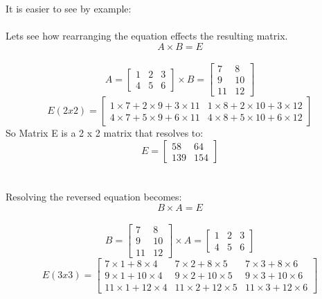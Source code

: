 \documentclass{article}
\begin{document}
It is easier to see by example:
\\
\\
Lets see how rearranging the equation effects the resulting matrix.
\begin{equation}
A \times B = E 
\end{equation}
\\
\[
A = \begin{bmatrix}
    1  &  2 & 3      \\
    4  &  5 & 6      
\end{bmatrix}
\times
B = \begin{bmatrix}
    7  &  8      \\
    9  &  10        \\
    11 & 12
\end{bmatrix}
\]
\[
E (2 x 2) = \begin{bmatrix}
    1 \times 7 + 2 \times 9 + 3 \times 11  &  1 \times 8 + 2 \times 10 + 3 \times 12     \\
    4 \times 7 + 5 \times 9 + 6 \times 11  &  4 \times 8 + 5 \times 10 + 6 \times 12     
\end{bmatrix}
\]
So Matrix E is a 2 x 2 matrix that resolves to:
\[
E = \begin{bmatrix}
    58  &  64     \\
    139  &  154     
\end{bmatrix}
\]
\\
\\
Resolving the reversed equation becomes:
\begin{equation}
B \times A = E 
\end{equation}
\\
\[
B = \begin{bmatrix}
    7  &  8      \\
    9  &  10        \\
    11 & 12
\end{bmatrix}
\times
A = \begin{bmatrix}
    1  &  2 & 3      \\
    4  &  5 & 6      
\end{bmatrix}
\]
\[
E (3 x 3) = \begin{bmatrix}
    7   \times 1 + 8   \times 4 & 7   \times 2 + 8   \times 5  &  7   \times 3 + 8   \times 6     \\
    9   \times 1 + 10 \times 4 & 9   \times 2 + 10 \times 5  &  9   \times 3 + 10 \times 6     \\
    11 \times 1 + 12 \times 4 & 11 \times 2 + 12 \times 5  &  11 \times 3 + 12 \times 6      
\end{bmatrix}
\]
\end{document}
